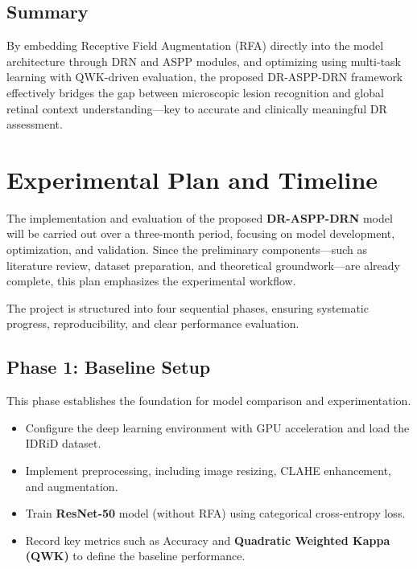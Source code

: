 \documentclass[12pt,a4paper]{article}
\begin{document}
\subsection{Summary}
By embedding Receptive Field Augmentation (RFA) directly into the model architecture through DRN and ASPP modules, and optimizing using multi-task learning with QWK-driven evaluation, the proposed DR-ASPP-DRN framework effectively bridges the gap between microscopic lesion recognition and global retinal context understanding—key to accurate and clinically meaningful DR assessment.

\section{Experimental Plan and Timeline}

The implementation and evaluation of the proposed \textbf{DR-ASPP-DRN} model will be carried out over a three-month period, focusing on model development, optimization, and validation.  
Since the preliminary components—such as literature review, dataset preparation, and theoretical groundwork—are already complete, this plan emphasizes the experimental workflow.  

The project is structured into four sequential phases, ensuring systematic progress, reproducibility, and clear performance evaluation.

\subsection{Phase 1: Baseline Setup}
This phase establishes the foundation for model comparison and experimentation.
\begin{itemize}[noitemsep, topsep=0pt]
    \item Configure the deep learning environment with GPU acceleration and load the IDRiD dataset.
    \item Implement preprocessing, including image resizing, CLAHE enhancement, and augmentation.
    \item Train \textbf{ResNet-50} model (without RFA) using categorical cross-entropy loss.
    \item Record key metrics such as Accuracy and \textbf{Quadratic Weighted Kappa (QWK)} to define the baseline performance.
\end{itemize}
\end{document}

